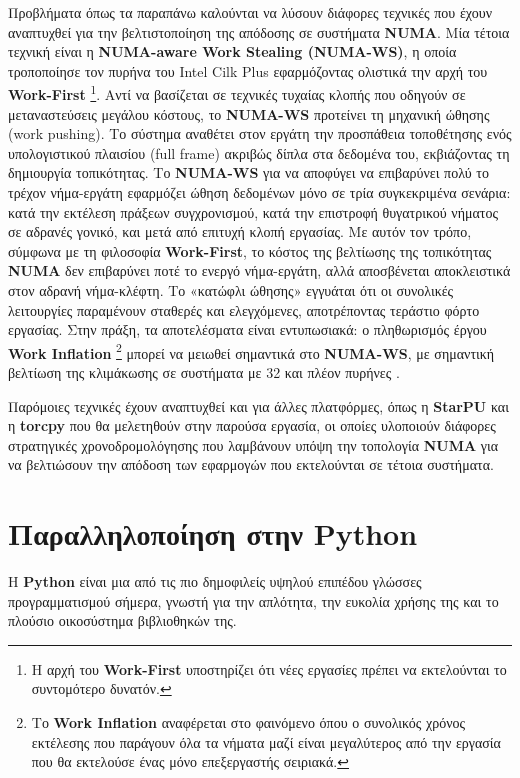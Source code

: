 Προβλήματα όπως τα παραπάνω καλούνται να λύσουν διάφορες τεχνικές που έχουν αναπτυχθεί για την βελτιστοποίηση της απόδοσης σε συστήματα \textbf{NUMA}. Μία τέτοια τεχνική είναι η \textbf{NUMA-aware Work Stealing (NUMA-WS)}, η οποία τροποποίησε τον πυρήνα του Intel Cilk Plus εφαρμόζοντας ολιστικά την αρχή του \textbf{Work-First} \footnote{Η αρχή του \textbf{Work-First} υποστηρίζει ότι νέες εργασίες πρέπει να εκτελούνται το συντομότερο δυνατόν.}. Αντί να βασίζεται σε τεχνικές τυχαίας κλοπής που οδηγούν σε μεταναστεύσεις μεγάλου κόστους, το \textbf{NUMA-WS} προτείνει τη μηχανική ώθησης (work pushing). Το σύστημα αναθέτει στον εργάτη την προσπάθεια τοποθέτησης ενός υπολογιστικού πλαισίου (full frame) ακριβώς δίπλα στα δεδομένα του, εκβιάζοντας τη δημιουργία τοπικότητας. Το \textbf{NUMA-WS} για να αποφύγει να επιβαρύνει πολύ το τρέχον νήμα-εργάτη εφαρμόζει ώθηση δεδομένων μόνο σε τρία συγκεκριμένα σενάρια: κατά την εκτέλεση πράξεων συγχρονισμού, κατά την επιστροφή θυγατρικού νήματος σε αδρανές γονικό, και μετά από επιτυχή κλοπή εργασίας. Με αυτόν τον τρόπο, σύμφωνα με τη φιλοσοφία \textbf{Work-First}, το κόστος της βελτίωσης της τοπικότητας \textbf{NUMA} δεν επιβαρύνει ποτέ το ενεργό νήμα-εργάτη, αλλά αποσβένεται αποκλειστικά στον αδρανή νήμα-κλέφτη. Το «κατώφλι ώθησης» εγγυάται ότι οι συνολικές λειτουργίες παραμένουν σταθερές και ελεγχόμενες, αποτρέποντας τεράστιο φόρτο εργασίας. Στην πράξη, τα αποτελέσματα είναι εντυπωσιακά: ο πληθωρισμός έργου \textbf{Work Inflation} \footnote{Το \textbf{Work Inflation} αναφέρεται στο φαινόμενο όπου ο συνολικός χρόνος εκτέλεσης που παράγουν όλα τα νήματα μαζί είναι μεγαλύτερος από την εργασία που θα εκτελούσε ένας μόνο επεξεργαστής σειριακά.} μπορεί να μειωθεί σημαντικά στο \textbf{NUMA-WS}, με σημαντική βελτίωση της κλιμάκωσης σε συστήματα με 32 και πλέον πυρήνες \cite{Deters_2018}.

Παρόμοιες τεχνικές έχουν αναπτυχθεί και για άλλες πλατφόρμες, όπως η \textbf{StarPU} \cite{augonnet2009starpu} και η \textbf{torcpy} \cite{hadjidoukas2020torcpy} που θα μελετηθούν στην παρούσα εργασία, οι οποίες υλοποιούν διάφορες στρατηγικές χρονοδρομολόγησης που λαμβάνουν υπόψη την τοπολογία \textbf{NUMA} για να βελτιώσουν την απόδοση των εφαρμογών που εκτελούνται σε τέτοια συστήματα.

\section{Παραλληλοποίηση στην Python}

Η \textbf{Python} είναι μια από τις πιο δημοφιλείς υψηλού επιπέδου γλώσσες προγραμματισμού σήμερα, γνωστή για την απλότητα, την ευκολία χρήσης της και το πλούσιο οικοσύστημα βιβλιοθηκών της. 

